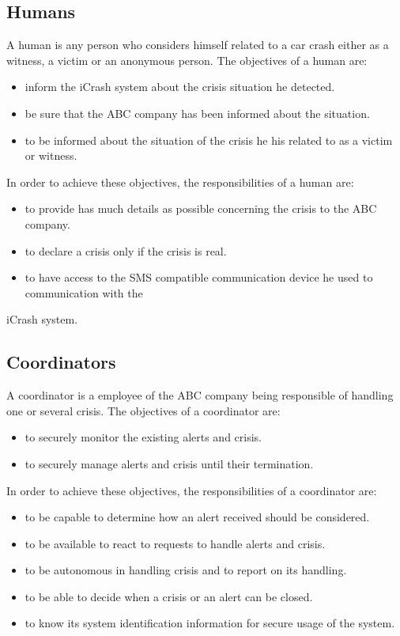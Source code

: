 \subsection{Humans}
A human is any person who considers himself related to a car crash either as a
witness, a victim or an anonymous person. The objectives of a human are:
\begin{itemize}
\item inform the iCrash system about the crisis situation he detected.
\item be sure that the ABC company has been informed about the situation.
\item to be informed about the situation of the crisis he his related to as a
 victim or witness.
\end{itemize}
In order to achieve these objectives, the responsibilities of a human are:
\begin{itemize}
\item to provide has much details as possible concerning the crisis to the ABC
 company.
\item  to declare a crisis only if the crisis is real.
\item  to have access to the SMS compatible communication device he used to
 communication with the
\end{itemize}
iCrash system.
\subsection{Coordinators}
A coordinator is a employee of the ABC company being responsible of handling one
or several crisis. The objectives of a coordinator are:
\begin{itemize}
\item   to securely monitor the existing alerts and crisis.
\item   to securely manage alerts and crisis until their termination.
\end{itemize}
In order to achieve these objectives, the responsibilities of a coordinator are:
\begin{itemize}
\item   to be capable to determine how an alert received should be considered.
\item   to be available to react to requests to handle alerts and crisis.
\item   to be autonomous in handling crisis and to report on its handling.
\item   to be able to decide when a crisis or an alert can be closed.
\item   to know its system identification information for secure usage of the
system.
\end{itemize}
